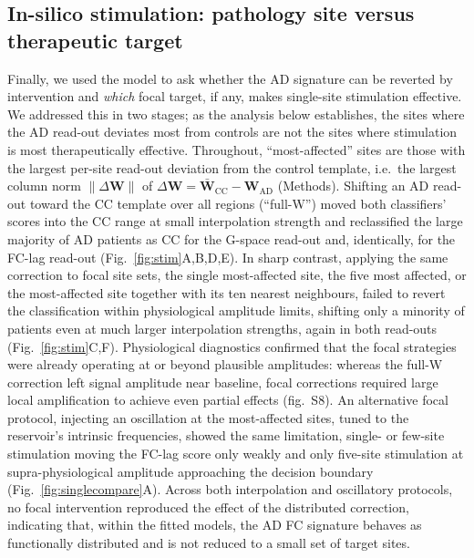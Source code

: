 \documentclass[11pt]{article}
\begin{document}
\subsection*{In-silico stimulation: pathology site versus therapeutic target}
Finally, we used the model to ask whether the AD signature can be reverted by
intervention and \emph{which} focal target, if any, makes single-site stimulation effective. We addressed this in two stages; as the
analysis below establishes, the sites where the AD read-out deviates most from
controls are not the sites where stimulation is most therapeutically effective.
Throughout, ``most-affected'' sites are those with the largest per-site read-out
deviation from the control template, i.e.\ the largest column norm
$\lVert\Delta\mathbf{W}\rVert$ of $\Delta\mathbf{W}=\bar{\mathbf{W}}_{\mathrm{CC}}
-\mathbf{W}_{\mathrm{AD}}$ (Methods). Shifting an AD
read-out toward the CC template over all regions (``full-W'') moved both
classifiers' scores into the CC range at small interpolation strength and
reclassified the large majority of AD patients as CC
for the G-space read-out and, identically, for the FC-lag read-out
(Fig.~\ref{fig:stim}A,B,D,E). In sharp contrast, applying the same correction to
focal site sets, the single most-affected site, the five most affected, or the
most-affected site together with its ten nearest neighbours, failed to revert
the classification within physiological amplitude limits, shifting only a
minority of patients even at much larger interpolation strengths, again in both
read-outs (Fig.~\ref{fig:stim}C,F). Physiological
diagnostics confirmed that the focal strategies were already operating at or
beyond plausible amplitudes: whereas the full-W correction left signal amplitude
near baseline, focal corrections required large local amplification to achieve
even partial effects (fig.~S8). An alternative focal
protocol, injecting an oscillation at the most-affected sites, tuned to the
reservoir's intrinsic frequencies, showed the same limitation, single- or
few-site stimulation moving the FC-lag score only weakly and only five-site
stimulation at supra-physiological amplitude approaching the decision boundary
(Fig.~\ref{fig:singlecompare}A). Across both interpolation and oscillatory protocols,
no focal intervention reproduced the effect of the distributed correction,
indicating that, within the fitted models, the AD FC signature behaves as
functionally distributed and is not reduced to a small set of target sites.
\end{document}
